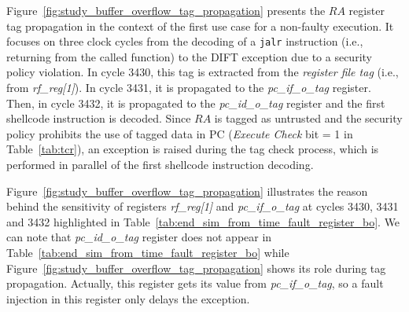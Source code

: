 Figure~\ref{fig:study_buffer_overflow_tag_propagation} presents the $RA$ register tag propagation in the context of the first use case for a non-faulty execution. It focuses on three clock cycles from the decoding of a \verb|jalr| instruction (i.e.,  returning from the called function) to the DIFT exception due to a security policy violation. 
In cycle 3430, this tag is extracted from the \textit{register file tag} (i.e., from \textit{rf\_reg[1]}). In cycle 3431, it is propagated to the \textit{pc\_if\_o\_tag} register. Then, in cycle 3432, it is propagated to the \textit{pc\_id\_o\_tag} register and the first shellcode instruction is decoded. Since $RA$ is tagged as untrusted and the security policy prohibits the use of tagged data in PC (\textit{Execute Check} bit = 1 in Table~\ref{tab:tcr}), an exception is raised during the tag check process, which is performed in parallel of the first shellcode instruction decoding.

Figure~\ref{fig:study_buffer_overflow_tag_propagation} illustrates the reason behind the sensitivity of registers \textit{rf\_reg[1]} and \textit{pc\_if\_o\_tag} at cycles 3430, 3431 and 3432 highlighted in  Table~\ref{tab:end_sim_from_time_fault_register_bo}. We can note that \textit{pc\_id\_o\_tag} register does not appear in Table~\ref{tab:end_sim_from_time_fault_register_bo} while Figure~\ref{fig:study_buffer_overflow_tag_propagation} shows its role during tag propagation. Actually, this register gets its value from \textit{pc\_if\_o\_tag}, so a fault injection in this register only delays the exception. 


